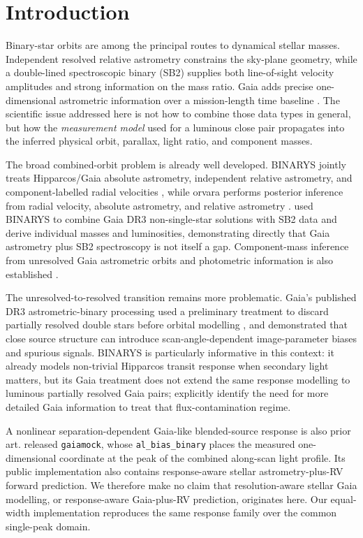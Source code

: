 \section{Introduction}
\label{sect:intro}

Binary-star orbits are among the principal routes to dynamical stellar masses. Independent resolved relative astrometry constrains the sky-plane geometry, while a double-lined spectroscopic binary (SB2) supplies both line-of-sight velocity amplitudes and strong information on the mass ratio. Gaia adds precise one-dimensional astrometric information over a mission-length time baseline \citep{GaiaMission2016}. The scientific issue addressed here is not how to combine those data types in general, but how the \emph{measurement model} used for a luminous close pair propagates into the inferred physical orbit, parallax, light ratio, and component masses.

The broad combined-orbit problem is already well developed. BINARYS jointly treats Hipparcos/Gaia absolute astrometry, independent relative astrometry, and component-labelled radial velocities \citep{Leclerc2023}, while orvara performs posterior inference from radial velocity, absolute astrometry, and relative astrometry \citep{Brandt2021}. \citet{Chevalier2023} used BINARYS to combine Gaia DR3 non-single-star solutions with SB2 data and derive individual masses and luminosities, demonstrating directly that Gaia astrometry plus SB2 spectroscopy is not itself a gap. Component-mass inference from unresolved Gaia astrometric orbits and photometric information is also established \citep{BailerJones2026}.

The unresolved-to-resolved transition remains more problematic. Gaia's published DR3 astrometric-binary processing used a preliminary treatment to discard partially resolved double stars before orbital modelling \citep{Halbwachs2023}, and \citet{Holl2023} demonstrated that close source structure can introduce scan-angle-dependent image-parameter biases and spurious signals. BINARYS is particularly informative in this context: it already models non-trivial Hipparcos transit response when secondary light matters, but its Gaia treatment does not extend the same response modelling to luminous partially resolved Gaia pairs; \citet{Leclerc2023} explicitly identify the need for more detailed Gaia information to treat that flux-contamination regime.

A nonlinear separation-dependent Gaia-like blended-source response is also prior art. \citet{ElBadry2024} released \texttt{gaiamock}, whose \texttt{al\_bias\_binary} places the measured one-dimensional coordinate at the peak of the combined along-scan light profile. Its public implementation also contains response-aware stellar astrometry-plus-RV forward prediction. We therefore make no claim that resolution-aware stellar Gaia modelling, or response-aware Gaia-plus-RV prediction, originates here. Our equal-width implementation reproduces the same response family over the common single-peak domain.

